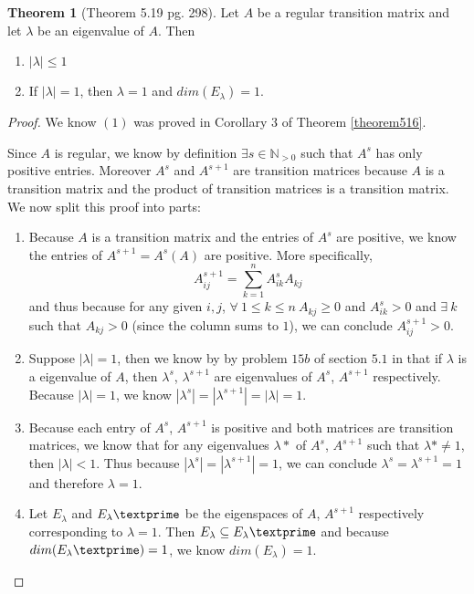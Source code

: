 \documentclass{amsart}
\theoremstyle{definition}
\newtheorem{theorem}{Theorem}
\theoremstyle{remark}
\numberwithin{equation}{section}
\begin{document}
\begin{theorem}[Theorem 5.19 pg. 298]\label{theorem519}
Let $A$ be a regular transition matrix and let $\lambda$ be an eigenvalue of $A$.  Then 

\begin{enumerate}
	\item $|\lambda| \leq 1$
	\item If $|\lambda| = 1$, then $\lambda = 1$ and $dim(E_{\lambda}) = 1$.

\end{enumerate}

\end{theorem}

\begin{proof}

We know $(1)$ was proved in Corollary 3 of Theorem \ref{theorem516}.

Since $A$ is regular, we know by definition $\exists s \in \mathbb{N}_{>0}$ such that $A^s$ has only positive entries.
Moreover $A^s$ and $A^{s+1}$ are transition matrices because $A$ is a transition matrix and the product of transition matrices is a transition matrix.
We now split this proof into parts:

\begin{enumerate}
	\item 
		Because $A$ is a transition matrix and the entries of $A^s$ are positive, we know the entries of $A^{s+1} = A^s(A)$ are positive.
		More specifically,
		$$A^{s+1}_{ij} = \sum_{k = 1}^nA^s_{ik}A_{kj}$$
		and thus because for any given $i, j$, $\forall\ 1 \leq k \leq n\ A_{kj} \geq 0$ and $A^s_{ik} > 0$ and $\exists\ k$ such that $A_{kj}  > 0$ (since the column sums to $1$), we can conclude $A^{s+1}_{ij} > 0$.

	\item 
		Suppose $|\lambda| = 1$, then we know by by problem $15b$ of section $5.1$ in \cite{friedberg2003linear} that if $\lambda$ is a eigenvalue of $A$, then $\lambda^s$, $\lambda^{s+1}$ are eigenvalues of $A^s$, $A^{s+1}$ respectively.  Because $|\lambda| = 1$, we know $ |\lambda^s |= |\lambda^{s+1} |= |\lambda| = 1$.

	\item
		Because each entry of $A^s$, $A^{s+1}$ is positive and both matrices are transition matrices, we know that for any eigenvalues $\lambda*$ of $A^s$, $A^{s+1}$ such that $\lambda* \neq 1$, then $|\lambda| < 1$.
		Thus because $|\lambda^s |= |\lambda^{s+1} |= 1 $, we can conclude $\lambda^s = \lambda^{s+1} = 1$ and therefore $\lambda = 1$.
	\item 

		Let $E_{\lambda}$ and $E_{\lambda}\textprime$ be the eigenspaces of $A$, $A^{s+1}$ respectively corresponding to $\lambda = 1$.
		Then $E_{\lambda} \subseteq E_{\lambda}\textprime$ and because $dim(E_{\lambda}\textprime) = 1$, we know $dim(E_{\lambda}) = 1$.
\end{enumerate}

\end{proof}
\end{document}

